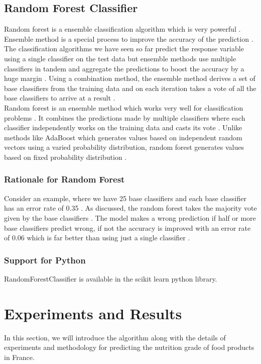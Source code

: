 \documentclass[sigconf]{acmart}
\begin{document}
\subsection{Random Forest Classifier}
Random forest is a ensemble classification algorithm which is very powerful \cite{book-tan}. Ensemble method is a special process to improve the accuracy of the prediction \cite{book-tan}. The classification algorithms we have seen so far predict the response variable using a single classifier on the test data but ensemble methods use multiple classifiers in tandem and aggregate the predictions to boost the accuracy by a huge margin \cite{book-tan}. Using a combination method, the ensemble method derives a set of base classifiers from the training data and on each iteration takes a vote of all the base classifiers to arrive at a result \cite{book-tan}. \\

Random forest is an ensemble method which works very well for classification problems \cite{book-tan}. It combines the predictions made by multiple classifiers where each classifier independently works on the training data and casts its vote \cite{book-tan}. Unlike methods like AdaBoost which generates values based on independent random vectors using a varied probability distribution, random forest generates values based on fixed probability distribution \cite{book-tan}. 

\subsubsection{Rationale for Random Forest}
Consider an example, where we have 25 base classifiers and each base classifier has an error rate of 0.35 \cite{book-tan}. As discussed, the random forest takes the majority vote given by the base classifiers \cite{book-tan}. The model makes a wrong prediction if half or more base classifiers predict wrong, if not the accuracy is improved with an error rate of 0.06 which is far better than using just a single classifier \cite{book-tan}.

\subsubsection{Support for Python} RandomForestClassifier is available in the scikit learn python library.

\section {Experiments and Results}
In this section, we will introduce the algorithm along with the details of experiments and methodology for predicting the nutrition grade of food products in France.
\end{document}
